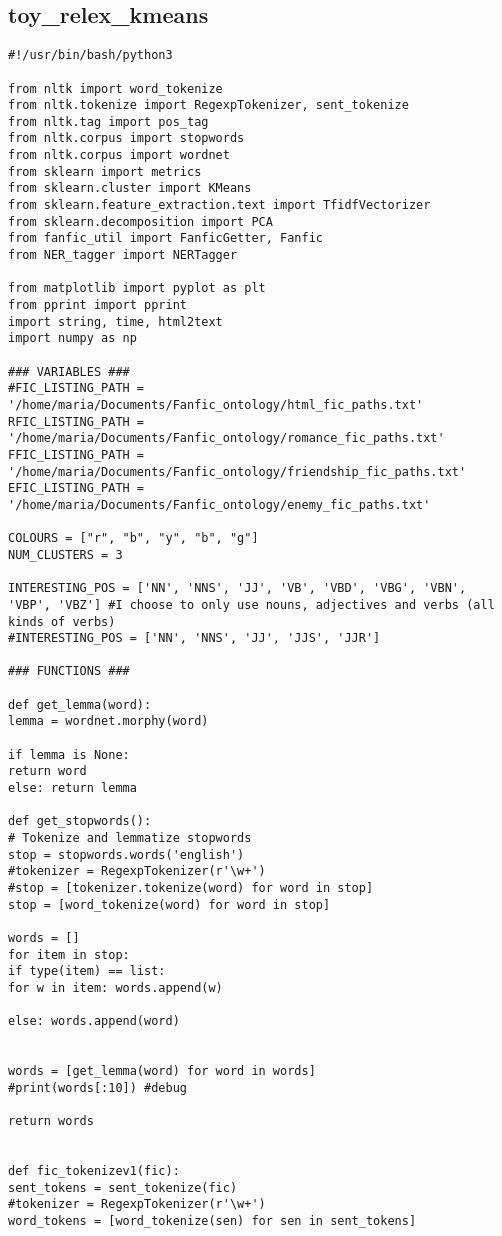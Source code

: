 \documentclass{pre-tfg}
\begin{document}
\subsection{toy\_relex\_kmeans}
\begin{lstlisting}[style=consola]
#!/usr/bin/bash/python3

from nltk import word_tokenize
from nltk.tokenize import RegexpTokenizer, sent_tokenize
from nltk.tag import pos_tag
from nltk.corpus import stopwords
from nltk.corpus import wordnet
from sklearn import metrics
from sklearn.cluster import KMeans
from sklearn.feature_extraction.text import TfidfVectorizer
from sklearn.decomposition import PCA
from fanfic_util import FanficGetter, Fanfic
from NER_tagger import NERTagger

from matplotlib import pyplot as plt
from pprint import pprint
import string, time, html2text
import numpy as np

### VARIABLES ###
#FIC_LISTING_PATH = '/home/maria/Documents/Fanfic_ontology/html_fic_paths.txt'
RFIC_LISTING_PATH = '/home/maria/Documents/Fanfic_ontology/romance_fic_paths.txt'
FFIC_LISTING_PATH = '/home/maria/Documents/Fanfic_ontology/friendship_fic_paths.txt'
EFIC_LISTING_PATH = '/home/maria/Documents/Fanfic_ontology/enemy_fic_paths.txt'

COLOURS = ["r", "b", "y", "b", "g"]
NUM_CLUSTERS = 3

INTERESTING_POS = ['NN', 'NNS', 'JJ', 'VB', 'VBD', 'VBG', 'VBN', 'VBP', 'VBZ'] #I choose to only use nouns, adjectives and verbs (all kinds of verbs)
#INTERESTING_POS = ['NN', 'NNS', 'JJ', 'JJS', 'JJR']

### FUNCTIONS ###

def get_lemma(word):
lemma = wordnet.morphy(word)

if lemma is None:
return word
else: return lemma

def get_stopwords():
# Tokenize and lemmatize stopwords
stop = stopwords.words('english')
#tokenizer = RegexpTokenizer(r'\w+')
#stop = [tokenizer.tokenize(word) for word in stop]
stop = [word_tokenize(word) for word in stop]

words = []
for item in stop:
if type(item) == list: 
for w in item: words.append(w)

else: words.append(word)


words = [get_lemma(word) for word in words]
#print(words[:10]) #debug

return words


def fic_tokenizev1(fic):
sent_tokens = sent_tokenize(fic)
#tokenizer = RegexpTokenizer(r'\w+')
word_tokens = [word_tokenize(sen) for sen in sent_tokens]


\end{lstlisting}
\end{document}
